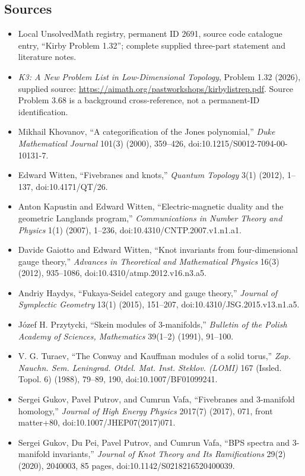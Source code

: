 \documentclass[11pt]{article}
\begin{document}
\subsection{Sources}
\begin{itemize}
\item Local UnsolvedMath registry, permanent ID 2691, source code catalogue entry, ``Kirby Problem 1.32''; complete supplied three-part statement and literature notes.
\item \emph{K3: A New Problem List in Low-Dimensional Topology}, Problem 1.32 (2026), supplied source: \url{https://aimath.org/pastworkshops/kirbylistrep.pdf}. Source Problem 3.68 is a background cross-reference, not a permanent-ID identification.
\item [Kho00] Mikhail Khovanov, ``A categorification of the Jones polynomial,'' \emph{Duke Mathematical Journal} 101(3) (2000), 359--426, doi:10.1215/S0012-7094-00-10131-7.
\item [Wit12] Edward Witten, ``Fivebranes and knots,'' \emph{Quantum Topology} 3(1) (2012), 1--137, doi:10.4171/QT/26.
\item [KW07] Anton Kapustin and Edward Witten, ``Electric-magnetic duality and the geometric Langlands program,'' \emph{Communications in Number Theory and Physics} 1(1) (2007), 1--236, doi:10.4310/CNTP.2007.v1.n1.a1.
\item [GW12] Davide Gaiotto and Edward Witten, ``Knot invariants from four-dimensional gauge theory,'' \emph{Advances in Theoretical and Mathematical Physics} 16(3) (2012), 935--1086, doi:10.4310/atmp.2012.v16.n3.a5.
\item [Hay15] Andriy Haydys, ``Fukaya-Seidel category and gauge theory,'' \emph{Journal of Symplectic Geometry} 13(1) (2015), 151--207, doi:10.4310/JSG.2015.v13.n1.a5.
\item [Prz91] Józef H. Przytycki, ``Skein modules of 3-manifolds,'' \emph{Bulletin of the Polish Academy of Sciences, Mathematics} 39(1--2) (1991), 91--100.
\item [Tur88] V. G. Turaev, ``The Conway and Kauffman modules of a solid torus,'' \emph{Zap. Nauchn. Sem. Leningrad. Otdel. Mat. Inst. Steklov. (LOMI)} 167 (Issled. Topol. 6) (1988), 79--89, 190, doi:10.1007/BF01099241.
\item [GPV17] Sergei Gukov, Pavel Putrov, and Cumrun Vafa, ``Fivebranes and 3-manifold homology,'' \emph{Journal of High Energy Physics} 2017(7) (2017), 071, front matter+80, doi:10.1007/JHEP07(2017)071.
\item [GPPV20] Sergei Gukov, Du Pei, Pavel Putrov, and Cumrun Vafa, ``BPS spectra and 3-manifold invariants,'' \emph{Journal of Knot Theory and Its Ramifications} 29(2) (2020), 2040003, 85 pages, doi:10.1142/S0218216520400039.

\end{itemize}
\end{document}
